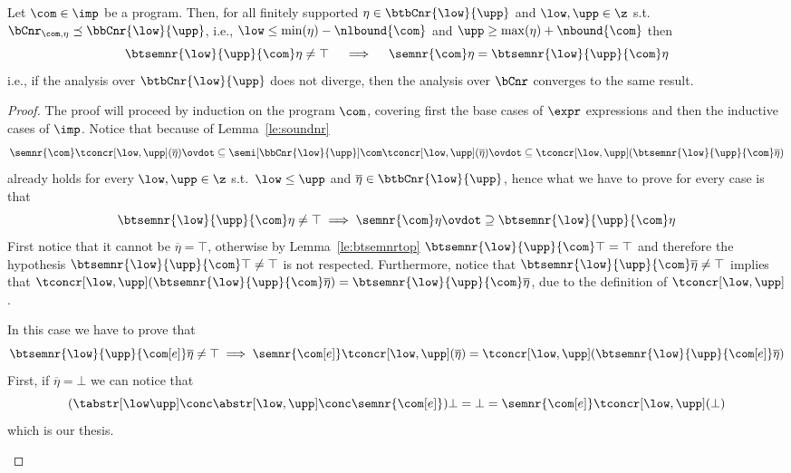\begin{theorem}
  Let \(\com\in\imp\) be a program. Then, for all finitely supported
  \(\eta \in \btbCnr{\low}{\upp}\) and \(\low, \upp \in \z\) s.t.\
  \(\bCnr_{\com,\eta} \preceq \bbCnr{\low}{\upp}\), i.e.,
  \(\low \leq \min(\eta) - \nlbound{\com}\) and
  \(\upp \geq \max(\eta) + \nbound{\com}\) then
  \begin{equation*}
    \btsemnr{\low}{\upp}{\com}\eta \neq \top
    \quad
    \implies
    \quad
    \semnr{\com}\eta = \btsemnr{\low}{\upp}{\com}\eta
  \end{equation*}
  i.e., if the analysis over \(\btbCnr{\low}{\upp}\) does not diverge,
  then the analysis over \(\bCnr\) converges to the same result.
\end{theorem}

\begin{proof}
  The proof will proceed by induction on the program \(\com\),
  covering first the base cases of \(\expr\) expressions and then the
  inductive cases of \(\imp\). Notice that because of
  Lemma~\ref{le:soundnr}
  \begin{equation*}
    \semnr{\com}\tconcr[\low,\upp](\overline\eta)
    \ovdot\subseteq
    \semi[\bbCnr{\low}{\upp}]{\com}\tconcr[\low,\upp](\overline\eta)
    \ovdot\subseteq
    \tconcr[\low,\upp](\btsemnr{\low}{\upp}{\com}\overline\eta)
  \end{equation*}
  already holds for every \(\low, \upp \in \z\) s.t.\ \(\low\leq \upp\)
  and \(\overline\eta \in \btbCnr{\low}{\upp}\), hence what we have to
  prove for every case is that
  \begin{equation*}
    \btsemnr{\low}{\upp}{\com}\eta \neq \top \implies \semnr{\com} \eta \ovdot\supseteq \btsemnr{\low}{\upp}{\com}\eta
  \end{equation*}
  First notice that it cannot be \(\overline\eta = \top\), otherwise
  by Lemma~\ref{le:btsemnrtop} \(\btsemnr{\low}{\upp}{\com}\top = \top\)
  and therefore the hypothesis
  \(\btsemnr{\low}{\upp}{\com}\top \neq \top\) is not
  respected. Furthermore, notice that
  \(\btsemnr{\low}{\upp}{\com}\overline\eta \neq \top\) implies that
  \(\tconcr[\low,\upp](\btsemnr{\low}{\upp}{\com}\overline\eta) =
  \btsemnr{\low}{\upp}{\com}\overline\eta\), due to the definition of
  \(\tconcr[\low,\upp]\).
  \begin{inductive}
    \case{\(\com[e]\)} In this case we have to prove that
    \begin{equation*}
      \btsemnr{\low}{\upp}{\com[e]}\overline{\eta} \neq \top \implies
      \semnr{\com[e]}\tconcr[\low,\upp](\overline\eta) = \tconcr[\low,\upp](\btsemnr{\low}{\upp}{\com[e]}\overline\eta)
    \end{equation*}
    First, if \(\overline\eta = \bot\) we can notice that
    \begin{equation*}
      (\tabstr[\low\upp] \conc \abstr[\low,\upp] \conc \semnr{\com[e]})\bot
      = \bot =
      \semnr{\com[e]}\tconcr[\low,\upp](\bot)
    \end{equation*}
    which is our thesis.


\end{inductive}
\end{proof}
